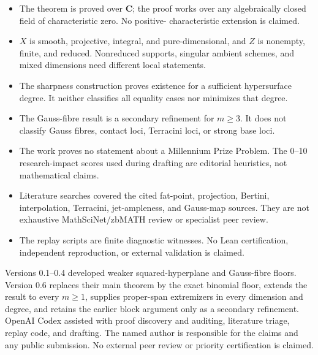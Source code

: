 \documentclass[11pt]{article}
\newcommand{\CC}{\mathbf C}
\begin{document}
\begin{itemize}[leftmargin=*]
\item The theorem is proved over $\CC$; the proof works over any
algebraically closed field of characteristic zero.  No positive-
characteristic extension is claimed.
\item $X$ is smooth, projective, integral, and pure-dimensional, and $Z$ is
nonempty, finite, and reduced.  Nonreduced supports, singular ambient schemes,
and mixed dimensions need different local statements.
\item The sharpness construction proves existence for a sufficient
hypersurface degree.  It neither classifies all equality cases nor minimizes
that degree.
\item The Gauss-fibre result is a secondary refinement for $m\geq3$.  It does
not classify Gauss fibres, contact loci, Terracini loci, or strong base loci.
\item The work proves no statement about a Millennium Prize Problem.  The
0--10 research-impact scores used during drafting are editorial heuristics,
not mathematical claims.
\item Literature searches covered the cited fat-point, projection, Bertini,
interpolation, Terracini, jet-ampleness, and Gauss-map sources.  They are not
exhaustive MathSciNet/zbMATH review or specialist peer review.
\item The replay scripts are finite diagnostic witnesses.  No Lean
certification, independent reproduction, or external validation is claimed.
\end{itemize}

Versions 0.1--0.4 developed weaker squared-hyperplane and Gauss-fibre floors.
Version 0.6 replaces their main theorem by the exact binomial floor, extends
the result to every $m\geq1$, supplies proper-span extremizers in every
dimension and degree, and retains the earlier block argument only as a
secondary refinement.  OpenAI Codex assisted with proof discovery and
auditing, literature triage, replay code, and drafting.  The named author is
responsible for the claims and any public submission.  No external peer
review or priority certification is claimed.
\end{document}
